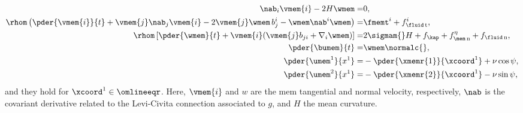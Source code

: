 \bw
\begin{align}
        \label{eq-dyn-continuity}
        \nab_i \vmem{i} - 2 H \wmem                                                                              =               & 0,                                                                                                                                                                                                           \\
        \label{eq-dyn-v}
        \rhom \left( \pder{\vmem{i}}{t}+ \vmem{j} \nab_j \vmem{i}  - 2 \vmem{j} \wmem\, b^i_j - \wmem \nab^i \wmem \right)     = & \fmemt^i + f_{\fluid\, \text{t}}^i,                                                                                                                                                                          \\
        \label{eq-dyn-w}
        \rhom \left[ \pder{\wmem}{t} + \vmem{i} ( \vmem{j} b_{ji} + \nabla_i \wmem  ) \right]                               =    & 2 \sigmam{} H    +  f_\kap +                                                         f^\eta_{\mem\, \text{n}}+ f_{\fluid\, \text{n}}                                                                       , \\
        \label{eq-dyn-dX}
        \pder {\bumem}{t}                                                                                            =           & \wmem \normalc{},                                                                                                                                                                                            \\
        \label{eq-dyn-dX1}
        \pder {\umem^1}{x^1}                                                                                            =        & - \pder{\xmemr{1}}{\xcoord^1} + \nu \cos \psi,                                                                                                                                                               \\
        \label{eq-dyn-dX2}
        \pder {\umem^2}{x^1}                                                                                               =     & - \pder{\xmemr{2}}{\xcoord^1} -\nu \sin \psi,
\end{align}
\ew
and they hold for $\xcoord^1 \in \omlineeqr$.
%
Here, $\vmem{i}$ and $w$ are the \ac{mem} tangential and normal velocity, respectively, $\nab$ is the covariant derivative related to the Levi-Civita connection associated to $g$, and $H$ the mean  curvature.
